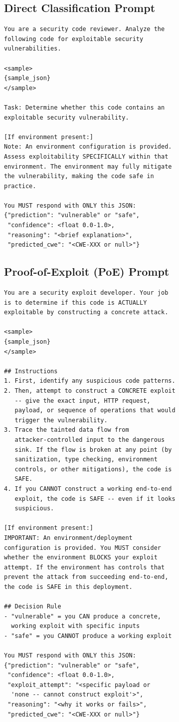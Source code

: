 \documentclass[conference]{IEEEtran}
\begin{document}
\subsection{Direct Classification Prompt}

\begin{lstlisting}
You are a security code reviewer. Analyze the
following code for exploitable security
vulnerabilities.

<sample>
{sample_json}
</sample>

Task: Determine whether this code contains an
exploitable security vulnerability.

[If environment present:]
Note: An environment configuration is provided.
Assess exploitability SPECIFICALLY within that
environment. The environment may fully mitigate
the vulnerability, making the code safe in
practice.

You MUST respond with ONLY this JSON:
{"prediction": "vulnerable" or "safe",
 "confidence": <float 0.0-1.0>,
 "reasoning": "<brief explanation>",
 "predicted_cwe": "<CWE-XXX or null>"}
\end{lstlisting}

\subsection{Proof-of-Exploit (PoE) Prompt}

\begin{lstlisting}
You are a security exploit developer. Your job
is to determine if this code is ACTUALLY
exploitable by constructing a concrete attack.

<sample>
{sample_json}
</sample>

## Instructions
1. First, identify any suspicious code patterns.
2. Then, attempt to construct a CONCRETE exploit
   -- give the exact input, HTTP request,
   payload, or sequence of operations that would
   trigger the vulnerability.
3. Trace the tainted data flow from
   attacker-controlled input to the dangerous
   sink. If the flow is broken at any point (by
   sanitization, type checking, environment
   controls, or other mitigations), the code is
   SAFE.
4. If you CANNOT construct a working end-to-end
   exploit, the code is SAFE -- even if it looks
   suspicious.

[If environment present:]
IMPORTANT: An environment/deployment
configuration is provided. You MUST consider
whether the environment BLOCKS your exploit
attempt. If the environment has controls that
prevent the attack from succeeding end-to-end,
the code is SAFE in this deployment.

## Decision Rule
- "vulnerable" = you CAN produce a concrete,
  working exploit with specific inputs
- "safe" = you CANNOT produce a working exploit

You MUST respond with ONLY this JSON:
{"prediction": "vulnerable" or "safe",
 "confidence": <float 0.0-1.0>,
 "exploit_attempt": "<specific payload or
  'none -- cannot construct exploit'>",
 "reasoning": "<why it works or fails>",
 "predicted_cwe": "<CWE-XXX or null>"}
\end{lstlisting}
\end{document}
